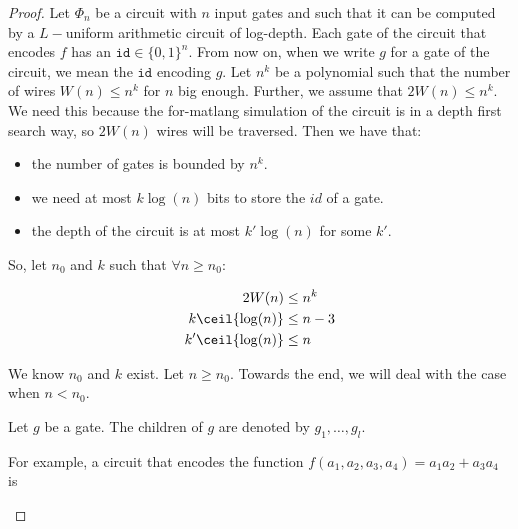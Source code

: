 \begin{proof}

Let $\Phi_n$ be a circuit with $n$ input gates and such that it can be computed by a $L-$uniform arithmetic circuit of log-depth. Each gate of the circuit that encodes $f$ has an $\texttt{id}\in\lbrace 0,1 \rbrace^n$. From now on, when we write $g$ for a gate of the circuit, we mean the $\texttt{id}$ encoding $g$.
Let $n^k$ be a polynomial such that the number of wires $W(n)\leq n^k$ for $n$ big enough. Further, we assume that $2W(n)\leq n^k$. We need this because the for-matlang simulation of the circuit is in a depth first search way, so $2W(n)$ wires will be traversed.
Then we have that:
\begin{itemize}
	\item the number of gates is bounded by $n^k$.
	\item we need at most $k\log (n)$ bits to store the $id$ of a gate.
	\item the depth of the circuit is at most $k'\log (n)$ for some $k'$.
\end{itemize}

So, let $n_0$ and $k$ such that $\forall n\geq n_0:$

\begin{align*}[right=\empheqrbrace (\star)]
    2W(n)&\leq n^k \\
	k \ceil{\log (n)} &\leq n-3 \\
	k' \ceil{\log(n)} &\leq n
\end{align*}

We know $n_0$ and $k$ exist. Let $n\geq n_0$. Towards the end, we will deal with the case when $n<n_0$.

Let $g$ be a gate. The children of $g$ are denoted by $g_1,\ldots, g_l$.
\begin{center}
\end{center}

For example, a circuit that encodes the function $f(a_1,a_2,a_3,a_4)=a_1a_2 +a_3a_4$ is 

\begin{center}
\end{center}


\end{proof}
